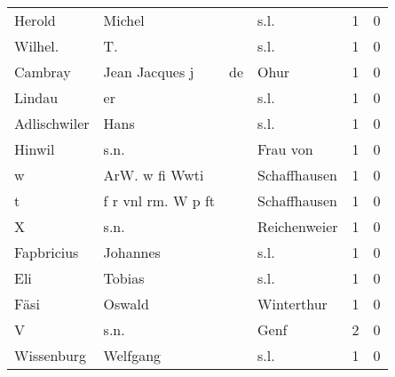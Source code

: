 \documentclass[10pt,a4paper,landscape]{article}
\begin{document}
\begin{longtable}{llllrr}
                   Herold &                             Michel &             &                                        s.l. &          1 &         0 \\
                  Wilhel. &                                 T. &             &                                        s.l. &          1 &         0 \\
                  Cambray &                     Jean Jacques j &          de &                                        Ohur &          1 &         0 \\
                   Lindau &                                 er &             &                                        s.l. &          1 &         0 \\
             Adlischwiler &                               Hans &             &                                        s.l. &          1 &         0 \\
                   Hinwil &                               s.n. &             &                                    Frau von &          1 &         0 \\
                        w &                     ArW. w fi Wwti &             &                                Schaffhausen &          1 &         0 \\
                        t &                 f r vnl rm. W p ft &             &                                Schaffhausen &          1 &         0 \\
                        X &                               s.n. &             &                                Reichenweier &          1 &         0 \\
               Fapbricius &                           Johannes &             &                                        s.l. &          1 &         0 \\
                      Eli &                             Tobias &             &                                        s.l. &          1 &         0 \\
                     Fäsi &                             Oswald &             &                                  Winterthur &          1 &         0 \\
                        V &                               s.n. &             &                                        Genf &          2 &         0 \\
               Wissenburg &                           Welfgang &             &                                        s.l. &          1 &         0 \\

\end{longtable}
\end{document}

